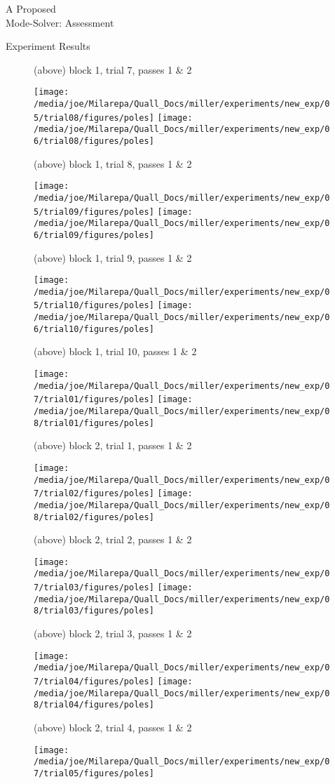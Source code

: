 \documentclass[a4paper,10pt]{report}
\numberwithin{equation}{section}
\begin{document}
\begin{chapter}{A Proposed \\Mode-Solver: Assessment}
\begin{section}{Experiment Results}
\begin{singlespace}
\begin{figure}[h]
\caption{(above) block 1, trial 7, passes 1 \& 2}
\texttt{[image: /media/joe/Milarepa/Quall\_Docs/miller/experiments/new\_exp/05/trial08/figures/poles]}
\texttt{[image: /media/joe/Milarepa/Quall\_Docs/miller/experiments/new\_exp/06/trial08/figures/poles]}
\caption{(above) block 1, trial 8, passes 1 \& 2}
\end{figure}
\begin{figure}[h]
\texttt{[image: /media/joe/Milarepa/Quall\_Docs/miller/experiments/new\_exp/05/trial09/figures/poles]}
\texttt{[image: /media/joe/Milarepa/Quall\_Docs/miller/experiments/new\_exp/06/trial09/figures/poles]}
\caption{(above) block 1, trial 9, passes 1 \& 2}
\texttt{[image: /media/joe/Milarepa/Quall\_Docs/miller/experiments/new\_exp/05/trial10/figures/poles]}
\texttt{[image: /media/joe/Milarepa/Quall\_Docs/miller/experiments/new\_exp/06/trial10/figures/poles]}
\caption{(above) block 1, trial 10, passes 1 \& 2}
\end{figure}
\begin{figure}[h]
\texttt{[image: /media/joe/Milarepa/Quall\_Docs/miller/experiments/new\_exp/07/trial01/figures/poles]}
\texttt{[image: /media/joe/Milarepa/Quall\_Docs/miller/experiments/new\_exp/08/trial01/figures/poles]}
\caption{(above) block 2, trial 1, passes 1 \& 2}
\end{figure}
\begin{figure}[h]
\texttt{[image: /media/joe/Milarepa/Quall\_Docs/miller/experiments/new\_exp/07/trial02/figures/poles]}
\texttt{[image: /media/joe/Milarepa/Quall\_Docs/miller/experiments/new\_exp/08/trial02/figures/poles]}
\caption{(above) block 2, trial 2, passes 1 \& 2}
\end{figure}
\begin{figure}[h]
\texttt{[image: /media/joe/Milarepa/Quall\_Docs/miller/experiments/new\_exp/07/trial03/figures/poles]}
\texttt{[image: /media/joe/Milarepa/Quall\_Docs/miller/experiments/new\_exp/08/trial03/figures/poles]}
\caption{(above) block 2, trial 3, passes 1 \& 2}
\texttt{[image: /media/joe/Milarepa/Quall\_Docs/miller/experiments/new\_exp/07/trial04/figures/poles]}
\texttt{[image: /media/joe/Milarepa/Quall\_Docs/miller/experiments/new\_exp/08/trial04/figures/poles]}
\caption{(above) block 2, trial 4, passes 1 \& 2}
\end{figure}
\begin{figure}[h]
\texttt{[image: /media/joe/Milarepa/Quall\_Docs/miller/experiments/new\_exp/07/trial05/figures/poles]}

\end{figure}
\end{singlespace}
\end{section}
\end{chapter}
\end{document}
